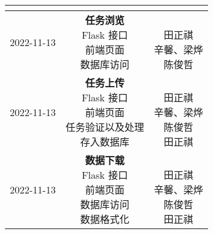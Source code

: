 \begin{table}[h!]
\begin{tabular}{ccc}
{        } \\\midrule
        2022-11-13 & \makecell[l]{\textbf{任务浏览} \\
            Flask 接口 \\
            前端页面 \\
            数据库访问 \\
        } & \makecell{ \\
            田正祺 \\
            辛馨、梁烨 \\
            陈俊哲 \\
        } \\\midrule
        2022-11-13 & \makecell[l]{\textbf{任务上传} \\
            Flask 接口 \\
            前端页面 \\
            任务验证以及处理 \\
            存入数据库 \\
        } & \makecell{ \\
            田正祺 \\
            辛馨、梁烨 \\
            陈俊哲 \\
            田正祺 \\
        } \\\midrule
        2022-11-13 & \makecell[l]{\textbf{数据下载} \\
            Flask 接口 \\
            前端页面 \\
            数据库访问 \\
            数据格式化 \\
        } & \makecell{ \\
            田正祺 \\
            辛馨、梁烨 \\
            陈俊哲 \\
            田正祺 \\
        } \\
        \bottomrule
    \end{tabular}
\end{table}

\newpage

